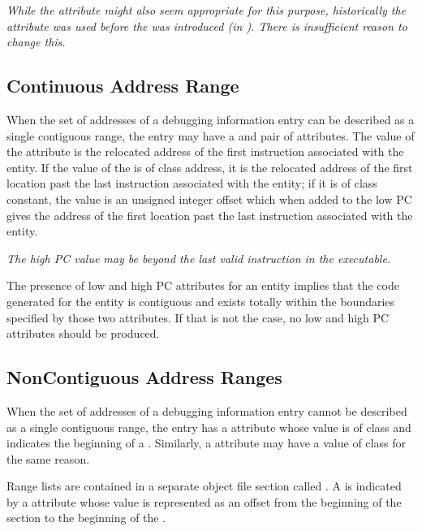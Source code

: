 \textit{While the \DWATentrypc{}
attribute might also seem appropriate for this purpose,
historically the \DWATlowpc{} attribute was used before the
\DWATentrypc{} was introduced 
(in ). There is
insufficient reason to change this.}

\subsection{Continuous Address Range}
\label{chap:contiguousaddressranges}
When the set of addresses of a debugging information entry can
be described as a single contiguous range, the entry 
may 
have
a \DWATlowpc{} and 
\DWAThighpc{} pair of attributes. 
The value
of the 
\DWATlowpc{} attribute 
is the relocated address of the
first instruction associated with the entity. If the value of
the \DWAThighpc{} is of class address, it is the relocated
address of the first location past the last instruction
associated with the entity; if it is of class constant, the
value is an unsigned integer offset which when added to the
low PC gives the address of the first location past the last
instruction associated with the entity.

\textit{The high PC value
may be beyond the last valid instruction in the executable.}

The presence of low and high PC attributes for an entity
implies that the code generated for the entity is contiguous
and exists totally within the boundaries specified by those
two attributes. If that is not the case, no low and high PC
attributes should be produced.

\subsection{Non\dash Contiguous Address Ranges}
\label{chap:noncontiguousaddressranges}
When the set of addresses of a debugging information entry
cannot be described as a single contiguous range, the entry has
a \DWATranges{} attribute 
whose value is of class 
and indicates the beginning of a .
Similarly,
a \DWATstartscope{} attribute 
may have a value of class
 for the same reason.  

Range lists are contained in a separate object file section called 
\dotdebugranges{}. A
 is indicated by a 
\DWATranges{} attribute whose
value is represented as an offset from the beginning of the
\dotdebugranges{} section to the beginning of the 
.

